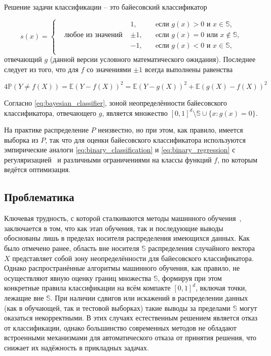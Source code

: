 Решение задачи классификации – это байесовский классификатор~\cite{vorontsov2008bayes}


\begin{equation}
    \label{eq:bayesian_classifier}
    s(x) = \left\{
\begin{alignedat}{2}
    &&1, \quad &\text{eсли } g(x) > 0 \text{ и } x \in \mathbb{S}, \\
    &\text{любое из значений } &\pm 1, \quad & \text{eсли } g(x) = 0 \text{ или } x \notin \mathbb{S}, \\
    &&-1, \quad &\text{eсли } g(x) < 0 \text{ и } x \in \mathbb{S}, \\
\end{alignedat}
\right.
\end{equation}
отвечающий \(g\) (данной версии условного математического ожидания). Последнее следует из того, что для \(f\) со значениями \(\pm 1\) всегда выполнены равенства

\[
    4\mathbb{P}(Y \neq f(X)) = \mathbb{E}\left(Y - f(X)\right)^2 = \mathbb{E}\left(Y - g(X)\right)^2 + \mathbb{E}\left(g(X) - f(X)\right)^2
\]

Согласно \cref{eq:bayesian_classifier}, зоной неопределённости байесовского классификатора, отвечающего \(g\), является множество \([0,1]^d \setminus \mathbb{S} \cup \{x: g(x) = 0\}\).

На практике распределение \(P\) неизвестно, но при этом, как правило, имеется выборка из \(P\), так что для оценки байесовского классификатора используются эмпирические аналоги \cref{eq:binary_classification} и \cref{eq:binary_regression} с регуляризацией~\cite{obi2023review} и различными ограничениями на классы функций \(f\), по которым ведётся оптимизация.

\subsection{Проблематика}\label{subsec:ch1/problems}

Ключевая трудность, с которой сталкиваются методы машинного обучения~\cite{muhamedyev2015machine}, заключается в том, что как этап обучения, так и последующие выводы обоснованы лишь в пределах носителя распределения имеющихся данных. Как было отмечено ранее, область вне носителя \(\mathbb{S}\) распределения случайного вектора \(X\) представляет собой зону неопределённости для байесовского классификатора. Однако распространённые алгоритмы машинного обучения, как правило, не осуществляют явную оценку границ множества \(\mathbb{S}\), формируя при этом конкретные правила классификации на всём компакте \([0, 1]^d\), включая точки, лежащие вне \(\mathbb{S}\). При наличии сдвигов или искажений в распределении данных (как в обучающей, так и тестовой выборках) такие выводы за пределами \(\mathbb{S}\) могут оказаться некорректными. В этих случаях естественным решением является отказ от классификации, однако большинство современных методов не обладают встроенными механизмами для автоматического отказа от принятия решения, что снижает их надёжность в прикладных задачах.

